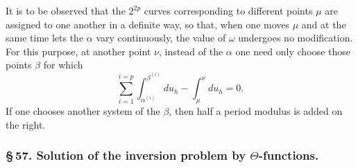 \documentclass[10pt]{article}
\begin{document}
It is to be observed that the \(2^{2p}\) curves corresponding to different points \(\mu\) are assigned to one another in a definite way, so that, when one moves \(\mu\) and at the same time lets the \(\alpha\) vary continuously, the value of \(\omega\) undergoes no modification. For this purpose, at another point \(\nu\), instead of the \(\alpha\) one need only choose those points \(\beta\) for which
\[
\sum_{i=1}^{i=p}\int_{\alpha^{(i)}}^{\beta^{(i)}}du_h-\int_{\mu}^{\nu}du_h=0.
\]
If one chooses another system of the \(\beta\), then half a period modulus is added on the right.

\subsubsection*{\S\,57. Solution of the inversion problem by \(\Theta\)-functions.}
\end{document}
